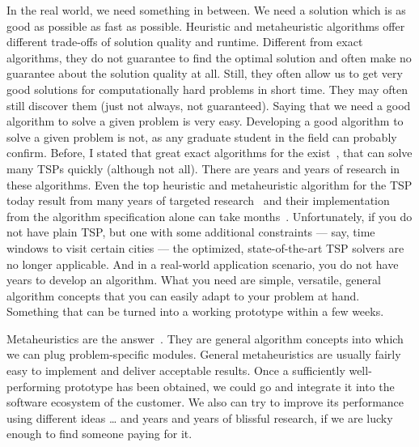 In the real world, we need something in between.
We need a solution which is as good as possible as fast as possible.
Heuristic and metaheuristic algorithms offer different trade-offs of solution quality and runtime.
Different from exact algorithms, they do not guarantee to find the optimal solution and often make no guarantee about the solution quality at all.
Still, they often allow us to get very good solutions for computationally hard problems in short time.
They may often still discover them (just not always, not guaranteed).%
\endhsection%
%
%
%
Saying that we need a good algorithm to solve a given problem is very easy.
Developing a good algorithm to solve a given problem is not, as any graduate student in the field can probably confirm.
Before, I stated that great exact algorithms for the  exist~\cite{CEG2007CWDPIFTSPT,C2021WT}, that can solve many TSPs quickly (although not all).
There are years and years of research in these algorithms.
Even the top heuristic and metaheuristic algorithm for the TSP today result from many years of targeted research~\cite{H2009GKOSFTLKTH,NK2013APGAUEACFTTSP,W2016BNMDPCADIM} and their implementation from the algorithm specification alone can take months~\cite{WWLC2019IIIOADTM}.
Unfortunately, if you do not have plain TSP, but one with some additional constraints --- say, time windows to visit certain cities --- the optimized, state-of-the-art TSP solvers are no longer applicable.
And in a real-world application scenario, you do not have years to develop an algorithm.
What you need are simple, versatile, general algorithm concepts that you can easily adapt to your problem at hand.
Something that can be turned into a working prototype within a few weeks.

Metaheuristics are the answer~\cite{W2009GOATAA,MF2004HTSIMH}.
They are general algorithm concepts into which we can plug problem-specific modules.
General metaheuristics are usually fairly easy to implement and deliver acceptable results.
Once a sufficiently well-performing prototype has been obtained, we could go and integrate it into the software ecosystem of the customer.
We also can try to improve its performance using different ideas {\dots} and years and years of blissful research, if we are lucky enough to find someone paying for it.%
\endhsection%
\endhsection%
%

